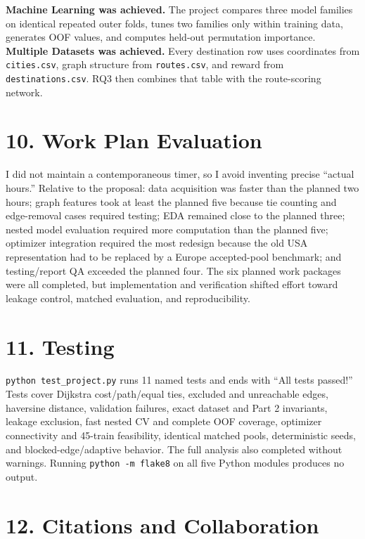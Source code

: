 \documentclass[11pt]{article}
\newcommand{\code}[1]{\texttt{#1}}
\begin{document}
\textbf{Machine Learning was achieved.} The project compares three model
families on identical repeated outer folds, tunes two families only within
training data, generates OOF values, and computes held-out permutation
importance. \textbf{Multiple Datasets was achieved.} Every destination row
uses coordinates from \code{cities.csv}, graph structure from
\code{routes.csv}, and reward from \code{destinations.csv}. RQ3 then combines
that table with the route-scoring network.

\section*{10. Work Plan Evaluation}

I did not maintain a contemporaneous timer, so I avoid inventing precise
``actual hours.'' Relative to the proposal: data acquisition was faster than
the planned two hours; graph features took at least the planned five because
tie counting and edge-removal cases required testing; EDA remained close to
the planned three; nested model evaluation required more computation than the
planned five; optimizer integration required the most redesign because the
old USA representation had to be replaced by a Europe accepted-pool
benchmark; and testing/report QA exceeded the planned four. The six planned
work packages were all completed, but implementation and verification shifted
effort toward leakage control, matched evaluation, and reproducibility.

\section*{11. Testing}

\code{python test\_project.py} runs 11 named tests and ends with
``All tests passed!'' Tests cover Dijkstra cost/path/equal ties, excluded and
unreachable edges, haversine distance, validation failures, exact dataset and
Part 2 invariants, leakage exclusion, fast nested CV and complete OOF
coverage, optimizer connectivity and 45-train feasibility, identical matched
pools, deterministic seeds, and blocked-edge/adaptive behavior. The full
analysis also completed without warnings. Running \code{python -m flake8}
on all five Python modules produces no output.

\section*{12. Citations and Collaboration}
\end{document}
